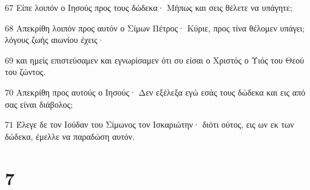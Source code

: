 \par 67 Είπε λοιπόν ο Ιησούς προς τους δώδεκα· Μήπως και σεις θέλετε να υπάγητε;
\par 68 Απεκρίθη λοιπόν προς αυτόν ο Σίμων Πέτρος· Κύριε, προς τίνα θέλομεν υπάγει; λόγους ζωής αιωνίου έχεις·
\par 69 και ημείς επιστεύσαμεν και εγνωρίσαμεν ότι συ είσαι ο Χριστός ο Υιός του Θεού του ζώντος.
\par 70 Απεκρίθη προς αυτούς ο Ιησούς· Δεν εξέλεξα εγώ εσάς τους δώδεκα και εις από σας είναι διάβολος;
\par 71 Έλεγε δε τον Ιούδαν του Σίμωνος τον Ισκαριώτην· διότι ούτος, εις ων εκ των δώδεκα, έμελλε να παραδώση αυτόν.

\chapter{7}

